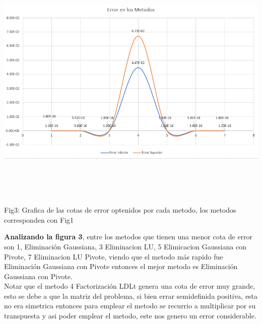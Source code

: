 \documentclass[10pt,a4paper]{article}
\begin{document}
\begin{center}
	\centering
\includegraphics[width=15.5cm,height=12cm]{Errorenlosmetodos.PNG}
	
	Fig3: Grafica de las cotas de error optenidos por cada metodo, los metodos corresponden con Fig1
\end{center}
\begin{multicols}{2}
\noindent \textbf{Analizando la figura 3}, entre los metodos que tienen una menor cota de error son 1, Eliminación Gaussiana, 3 Eliminacion LU, 5 Elimicacion Gaussiana con Pivote, 7 Eliminacion LU Pivote, viendo que el metodo más rapido fue Eliminación Gaussiana con Pivote entonces el mejor metodo es Eliminación Gaussiana con Pivote.\\
\noindent Notar que el metodo 4 Factorización LDLt genera una cota de error muy grande, esto se debe a que la matriz del problema, si bien errar semidefinida positiva, esta no era simetrica entonces para emplear el metodo se recurrio a multiplicar por su transpuesta y asi poder emplear el metodo, este nos genero un error considerable.\\
\end{multicols}
\end{document}
